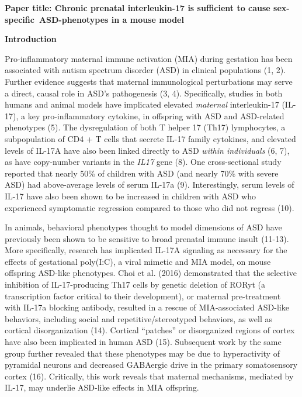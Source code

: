 \documentclass[]{article}
\date{}
\begin{document}
\textbf{Paper title: Chronic prenatal interleukin-17 is sufficient to
cause sex-specific~ASD-phenotypes in a mouse model}

\textbf{Introduction}

Pro-inflammatory maternal immune activation (MIA) during gestation has
been associated with autism spectrum disorder (ASD) in clinical
populations (1, 2). 
Further evidence suggests that maternal
immunological perturbations may serve a direct, causal role in ASD's
pathogenesis (3, 4). Specifically, studies in both humans and animal
models have implicated elevated \emph{maternal} interleukin-17 (IL-17),
a key pro-inflammatory cytokine, in offspring with ASD and ASD-related
phenotypes (5). The dysregulation of both T helper 17 (Th17)
lymphocytes, a subpopulation of CD4 + T cells that secrete IL-17 family
cytokines, and elevated levels of IL-17A have also been linked directly
to ASD \emph{within individuals} (6, 7), as have copy-number variants in
the \emph{IL17} gene (8). One cross-sectional study reported that nearly
50\% of children with ASD (and nearly 70\% with severe ASD) had
above-average levels of serum IL-17a (9). Interestingly, serum levels of
IL-17 have also been shown to be increased in children with ASD who
experienced symptomatic regression compared to those who did not regress
(10).

In animals, behavioral phenotypes thought to model dimensions of ASD
have previously been shown to be sensitive to broad prenatal immune
insult (11-13). More specifically, research has implicated IL-17A
signaling as necessary for the effects of gestational poly(I:C), a viral
mimetic and MIA model, on mouse offspring ASD-like phenotypes. Choi et
al. (2016) demonstrated that the selective inhibition of IL-17-producing
Th17 cells by genetic deletion of RORyt (a transcription factor critical to
their development), or maternal pre-treatment with IL-17a
blocking antibody, resulted in a rescue of MIA-associated ASD-like
behaviors, including social and repetitive/stereotyped behaviors, as
well as cortical disorganization (14). Cortical ``patches'' or
disorganized regions of cortex have also been implicated in human ASD
(15). Subsequent work by the same group further revealed that these
phenotypes may be due to hyperactivity of pyramidal neurons and
decreased GABAergic drive in the primary somatosensory cortex (16).
Critically, this work reveals that maternal mechanisms, mediated by
IL-17, may underlie ASD-like effects in MIA offspring.
\end{document}

